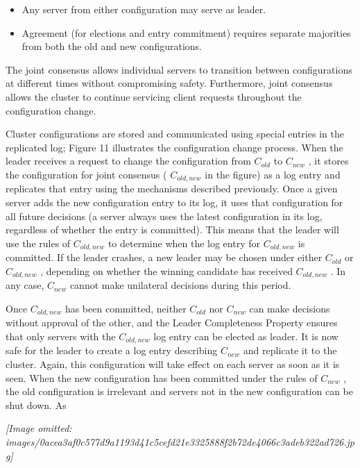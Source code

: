 \documentclass[
]{article}
\providecommand{\tightlist}{%
  \setlength{\itemsep}{0pt}\setlength{\parskip}{0pt}}
\begin{document}
\begin{itemize}
\tightlist
\item
  Any server from either configuration may serve as leader.\\
\item
  Agreement (for elections and entry commitment) requires separate
  majorities from both the old and new configurations.
\end{itemize}

The joint consensus allows individual servers to transition between
configurations at different times without compromising safety.
Furthermore, joint consensus allows the cluster to continue servicing
client requests throughout the configuration change.

Cluster configurations are stored and communicated using special entries
in the replicated log; Figure 11 illustrates the configuration change
process. When the leader receives a request to change the configuration
from \(C_{old}\) to \(C_{new}\) , it stores the configuration for joint
consensus ( \(C_{old,new}\) in the figure) as a log entry and replicates
that entry using the mechanisms described previously. Once a given
server adds the new configuration entry to its log, it uses that
configuration for all future decisions (a server always uses the latest
configuration in its log, regardless of whether the entry is committed).
This means that the leader will use the rules of \(C_{old,new}\) to
determine when the log entry for \(C_{old,new}\) is committed. If the
leader crashes, a new leader may be chosen under either \(C_{old}\) or
\(C_{old,new}\) , depending on whether the winning candidate has
received \(C_{old,new}\) . In any case, \(C_{new}\) cannot make
unilateral decisions during this period.

Once \(C_{old,new}\) has been committed, neither \(C_{old}\) nor
\(C_{new}\) can make decisions without approval of the other, and the
Leader Completeness Property ensures that only servers with the
\(C_{old,new}\) log entry can be elected as leader. It is now safe for
the leader to create a log entry describing \(C_{new}\) and replicate it
to the cluster. Again, this configuration will take effect on each
server as soon as it is seen. When the new configuration has been
committed under the rules of \(C_{new}\) , the old configuration is
irrelevant and servers not in the new configuration can be shut down. As

\textit{[Image omitted: images/0acea3af0c577d9a1193d41c5cefd21e3325888f2b72de4066c3adeb322ad726.jpg]}
\end{document}
